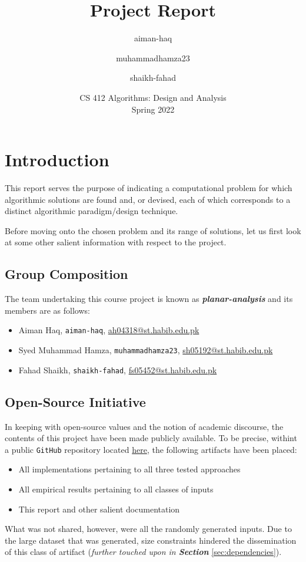 \documentclass[a4paper, 12pt]{report}
\title{Project Report}
\author{aiman-haq \and muhammadhamza23 \and shaikh-fahad}
\date{CS 412 Algorithms: Design and Analysis\\Spring 2022}
\theoremstyle{definition}
\begin{document}

\tableofcontents

\chapter{Introduction}

This report serves the purpose of indicating a computational problem for which algorithmic solutions are found and, or devised, each of which corresponds to a distinct algorithmic paradigm/design technique.

\noindent
Before moving onto the chosen problem and its range of solutions, let us first look at some other salient information with respect to the project.

\section{Group Composition}
The team undertaking this course project is known as \emph{\textbf{planar-analysis}} and its members are as follows:
\begin{itemize}
    \item Aiman Haq, \texttt{aiman-haq}, \href{mailto:ah04318@st.habib.edu.pk}{ah04318@st.habib.edu.pk}
    \item Syed Muhammad Hamza,  \texttt{muhammadhamza23}, \href{mailto:sh05192@st.habib.edu.pk}{sh05192@st.habib.edu.pk}
    \item Fahad Shaikh, \texttt{shaikh-fahad}, \href{mailto:fs05452@st.habib.edu.pk}{fs05452@st.habib.edu.pk}
\end{itemize}

\section{Open-Source Initiative}
In keeping with open-source values and the notion of academic discourse, the contents of this project have been made publicly available.
To be precise, withint a public \texttt{GitHub} repository located \href{https://github.com/shaikh-fahad/comparision-of-single-source-shortest-path-algorithms.git}{here},
the following artifacts have been placed:
\begin{itemize}
    \item All implementations pertaining to all three tested approaches
    \item All empirical results pertaining to all classes of inputs
    \item This report and other salient documentation
\end{itemize}
What was not shared, however, were all the randomly generated inputs. Due to the large dataset that was generated, size constraints hindered the 
dissemination of this class of artifact (\emph{further touched upon in \textbf{Section}} \ref{sec:dependencies}).
\end{document}
